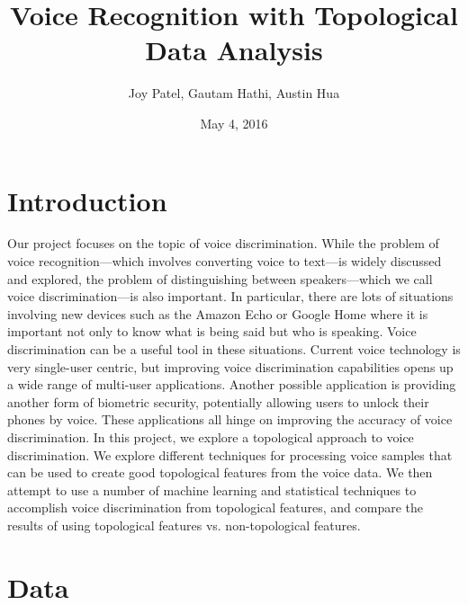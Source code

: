 \documentclass[12pt]{article}
\title{Voice Recognition with Topological Data Analysis}
\author{Joy Patel, Gautam Hathi, Austin Hua}
\date{May 4, 2016}
\begin{document}
\maketitle

\newpage
\tableofcontents

\newpage
\section{Introduction}
\-\hspace{1cm} Our project focuses on the topic of voice discrimination. While
the problem of voice recognition—which involves converting voice to text—is
widely discussed and explored, the problem of distinguishing between
speakers—which we call voice discrimination—is also important. In particular,
there are lots of situations involving new devices such as the Amazon Echo or
Google Home where it is important not only to know what is being said but who
is speaking. Voice discrimination can be a useful tool in these situations.
Current voice technology is very single-user centric, but improving voice
discrimination capabilities opens up a wide range of multi-user applications.
Another possible application is providing another form of biometric security,
potentially allowing users to unlock their phones by voice. These applications
all hinge on improving the accuracy of voice discrimination.
\newline \-\hspace{1cm} In this project, we explore a topological approach to
voice discrimination. We explore different techniques for processing voice
samples that can be used to create good topological features from the voice
data. We then attempt to use a number of machine learning and statistical
techniques to accomplish voice discrimination from topological features, and
compare the results of using topological features vs. non-topological features.

\section{Data}
\end{document}
